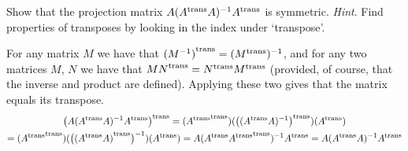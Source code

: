 \begin{exercises}
    Show that the projection matrix \( A({{A}^{\rm trans}}A)^{-1}{{A}^{\rm trans}} \) 
    is symmetric. 
    \cite{Strang}
    \textit{Hint}.  Find properties of transposes by looking in the index
      under `transpose'.
    \begin{answer}
      For any matrix $M$ we have that ${{(M^{-1})}^{\rm trans}}=({{M}^{\rm trans}})^{-1}$,
      and for any two matrices $M$, $N$ we have that 
      ${{MN}^{\rm trans}}={{N}^{\rm trans}}{{M}^{\rm trans}}$ (provided, of course, 
      that the inverse and product are defined).
      Applying these two gives that the matrix equals its transpose.
      \begin{multline*}
         {{\bigl(A( {{A}^{\rm trans}} A)^{-1} {{A}^{\rm trans}} \bigr)}^{\rm trans}}
         =({{{{A}^{\rm trans}}}^{\rm trans}})
           ({{\bigl(({{A}^{\rm trans}}A)^{-1}\bigr)}^{\rm trans}})
           ({{A}^{\rm trans}})                               \\
         =({{{{A}^{\rm trans}}}^{\rm trans}})
           ( \bigl({{({{A}^{\rm trans}}A)}^{\rm trans}}\bigr)^{-1} )
           ({{A}^{\rm trans}})                    
         =A
           ({{A}^{\rm trans}}{{{{A}^{\rm trans}}}^{\rm trans}})^{-1}
           {{A}^{\rm trans}}
         =A
           ({{A}^{\rm trans}}A)^{-1}
           {{A}^{\rm trans}}
      \end{multline*}
    \end{answer}
\end{exercises}
